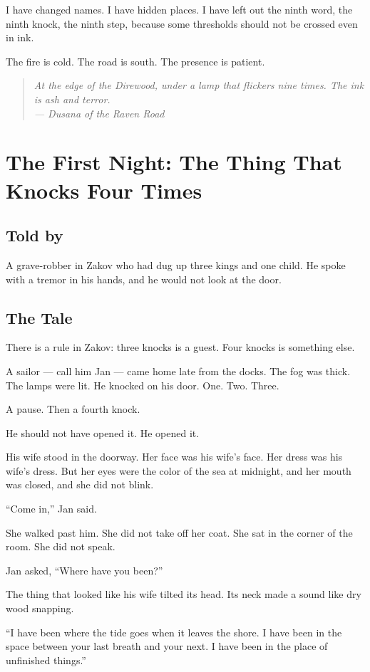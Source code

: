 \documentclass[10pt,twoside]{book}
\newcommand{\dusana}[1]{\begin{quote}\itshape #1 \\ --- Dusana of the Raven Road\end{quote}}
\begin{document}
I have changed names. I have hidden places. I have left out the ninth word, the ninth knock, the ninth step, because some thresholds should not be crossed even in ink.

The fire is cold. The road is south. The presence is patient.

\dusana{At the edge of the Direwood, under a lamp that flickers nine times. The ink is ash and terror.}


\chapter{The First Night: The Thing That Knocks Four Times}

\section*{Told by}
A grave-robber in Zakov who had dug up three kings and one child. He spoke with a tremor in his hands, and he would not look at the door.

\section*{The Tale}
There is a rule in Zakov: three knocks is a guest. Four knocks is something else.

A sailor --- call him Jan --- came home late from the docks. The fog was thick. The lamps were lit. He knocked on his door. One. Two. Three.

A pause. Then a fourth knock.

He should not have opened it. He opened it.

His wife stood in the doorway. Her face was his wife's face. Her dress was his wife's dress. But her eyes were the color of the sea at midnight, and her mouth was closed, and she did not blink.

``Come in,'' Jan said.

She walked past him. She did not take off her coat. She sat in the corner of the room. She did not speak.

Jan asked, ``Where have you been?''

The thing that looked like his wife tilted its head. Its neck made a sound like dry wood snapping.

``I have been where the tide goes when it leaves the shore. I have been in the space between your last breath and your next. I have been in the place of unfinished things.''
\end{document}
